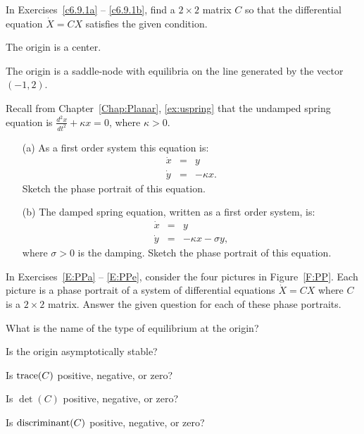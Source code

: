 \documentclass{ximera}
\begin{document}
\EXER

\TEXER

\noindent In Exercises~\ref{c6.9.1a} -- \ref{c6.9.1b}, find a $2\times 2$
matrix $C$ so that the differential equation $\dot{X}=CX$ satisfies the
given condition.
\begin{exercise} \label{c6.9.1a}
The origin is a center.
\end{exercise}
\begin{exercise} \label{c6.9.1b}
The origin is a saddle-node with equilibria on the line generated by the
vector $(-1,2)$.
\end{exercise}

\begin{exercise} \label{c6.9.2}
Recall from Chapter~\ref{Chap:Planar}, \eqref{ex:uspring} that the undamped
spring equation is $\frac{d^2x}{dt^2} + \kappa x = 0$, where $\kappa>0$.
\begin{itemize}
\item[(a)]   As a first order system this equation is:
\begin{eqnarray*}
\dot{x} & = & y \\
\dot{y} & = & -\kappa x.
\end{eqnarray*}
Sketch the phase portrait of this equation.
\item[(b)]  The damped spring equation, written as a first order system, is:
\begin{eqnarray*}
\dot{x} & = & y \\
\dot{y} & = & -\kappa x-\sigma y,
\end{eqnarray*}
where $\sigma>0$ is the damping.  Sketch the phase portrait of this equation.
\end{itemize}
\end{exercise}

\noindent In Exercises~\ref{E:PPa} -- \ref{E:PPe}, consider the four pictures
in Figure~\ref{F:PP}.  Each picture is a phase portrait of a system of
differential equations $\dot{X}=CX$ where $C$ is a $2\times 2$ matrix.  Answer
the given question for each of these phase portraits.
\begin{exercise}  \label{E:PPa}
What is the name of the type of equilibrium at the origin?
\end{exercise}
\begin{exercise}  \label{E:PPb}
Is the origin asymptotically stable?
\end{exercise}
\begin{exercise}  \label{E:PPc}
Is ${\rm trace}(C)$ positive, negative, or zero?
\end{exercise}
\begin{exercise}  \label{E:PPd}
Is $\det(C)$ positive, negative, or zero?
\end{exercise}
\begin{exercise}  \label{E:PPe}
Is ${\rm discriminant}(C)$ positive, negative, or zero?
\end{exercise}
\end{document}
